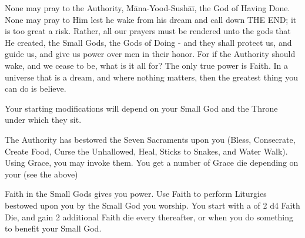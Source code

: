 {  


  None may pray to the Authority, Māna-Yood-Sushāī, the God of Having Done.  None may pray to Him lest he wake from his dream and call down THE END; it is too great a risk.  Rather, all our prayers must be rendered unto  the gods that He created, the Small Gods, the Gods of Doing - and they shall protect us, and guide us, and give us power over men in their honor.  For if the Authority should wake, and we cease to be, what is it all for?  The only true power is Faith.  In a universe that is a dream, and where nothing matters, then the greatest thing you can do is believe.


  Your starting modifications will depend on your Small God and the Throne under which they sit.\footnotemark


  
  \footnotemark[\value{footnote}] 
  The Authority has bestowed the Seven Sacraments upon you (Bless, Consecrate, Create Food, Curse the Unhallowed, Heal, Sticks to Snakes, and Water Walk). Using Grace, you may invoke them.  You get a number of Grace die depending on your \LVL (see the  above)
  
  \footnotemark[\value{footnote}] 
  Faith in the Small Gods gives you power. Use Faith to perform Liturgies bestowed upon you by the Small God you worship.  You start with a \POOL of 2 d4 Faith Die, and gain 2 additional Faith die every \LVL thereafter, or when you do something to benefit your Small God.

}
